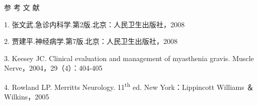 \hypertarget{text00129.htmlux5cux23CHP4-17-4}{}
参 考 文 献

1. 张文武.急诊内科学.第2版.北京：人民卫生出版社，2008

2. 贾建平.神经病学.第7版.北京：人民卫生出版社，2008

3. Keesey JC. Clinical evaluation and management of myasthenia gravis.
Muscle Nerve，2004，29（4）：404-405

4. Rowland LP. Merritts Neurology. 11\textsuperscript{th} ed. New
York：Lippincott Williams ＆ Wilkins，2005

\protect\hypertarget{text00130.html}{}{}

